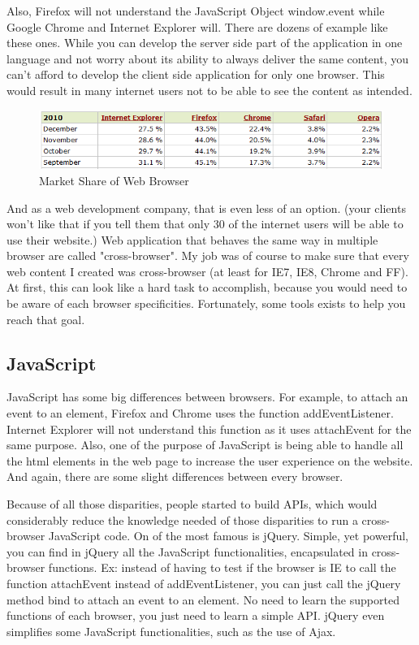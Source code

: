 Also, Firefox will not understand the JavaScript Object window.event while Google Chrome and Internet Explorer will. There are dozens of example like these ones.
While you can develop the server side part of the application in one language and not worry about its ability to always deliver the same content, you can't afford to develop the client side application for only one browser. This would result in many internet users not to be able to see the content as intended.

\begin{figure}[!ht]
\centering
\includegraphics[width=.55\textwidth]{img/browser_statistics.png}
\caption{Market Share of Web Browser}
\label{figure:market-brosers}
\end{figure}

And as a web development company, that is even less of an option. (your clients won't like that if you tell them that only 30 of the internet users will be able to use their website.)
Web application that behaves the same way in multiple browser are called "cross-browser". 
My job was of course to make sure that every web content I created was cross-browser (at least for IE7, IE8, Chrome and FF).
At first, this can look like a hard task to accomplish, because you would need to be aware of each browser specificities. Fortunately, some tools exists to help you reach that goal.

\subsection{JavaScript}

JavaScript has some big differences between browsers. For example, to attach an event to an element, Firefox and Chrome uses the function addEventListener. Internet Explorer will not understand this function as it uses attachEvent for the same purpose. %
Also, one of the purpose of JavaScript is being able to handle all the html elements in the web page to increase the user experience on the website. And again, there are some slight differences between every browser.

Because of all those disparities, people started to build APIs, which would considerably reduce the knowledge needed of those disparities to run a cross-browser JavaScript code. On of the most famous is jQuery. Simple, yet powerful, you can find in jQuery all the JavaScript functionalities, encapsulated in cross-browser functions. Ex: instead of having to test if the browser is IE to call the function attachEvent instead of addEventListener, you can just call the jQuery method bind to attach an event to an element. No need to learn the supported functions of each browser, you just need to learn a simple API. jQuery even simplifies some JavaScript functionalities, such as the use of Ajax.

